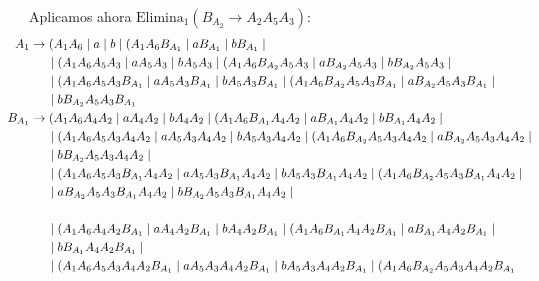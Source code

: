 \documentclass[12pt]{article}
\begin{document}
\begin{ejercicio}[2.5 puntos]
\begin{description}
        Aplicamos ahora $\text{Elimina}_1(B_{A_2}\rightarrow A_2 A_5 A_3)$:
        \begin{align*}
            \hspace{-2.5cm}A_1 &\to (A_1 A_6 \mid a \mid b\mid (A_1 A_6 B_{A_1} \mid a B_{A_1} \mid b B_{A_1}
                \mid \\ & \hspace{0.5cm} \mid (A_1 A_6A_5A_3 \mid aA_5A_3 \mid bA_5A_3 \mid (A_1 A_6 B_{A_2}A_5A_3 \mid  a B_{A_2}A_5A_3 \mid  b B_{A_2}A_5A_3
                \mid \\ & \hspace{0.5cm} \mid (A_1 A_6 A_5 A_3 B_{A_1} \mid aA_5 A_3 B_{A_1} \mid bA_5 A_3 B_{A_1} \mid (A_1 A_6 B_{A_2}A_5 A_3 B_{A_1} \mid  a B_{A_2}A_5 A_3 B_{A_1}
                \mid \\ & \hspace{0.5cm} \mid b B_{A_2}A_5 A_3 B_{A_1} \\
            \hspace{-2.5cm}B_{A_1} &\to (A_1 A_6 A_4 A_2 \mid aA_4 A_2 \mid bA_4 A_2\mid (A_1 A_6 B_{A_1}A_4 A_2 \mid a B_{A_1}A_4 A_2 \mid b B_{A_1}A_4 A_2
                \mid \\ & \hspace{0.5cm} \mid (A_1 A_6A_5A_3A_4 A_2 \mid aA_5A_3 A_4 A_2\mid bA_5A_3A_4 A_2 \mid (A_1 A_6 B_{A_2}A_5A_3 A_4 A_2\mid  a B_{A_2}A_5A_3A_4 A_2
                \mid \\ & \hspace{0.5cm} \mid b B_{A_2}A_5A_3A_4 A_2
                \mid \\ & \hspace{0.5cm} \mid (A_1 A_6 A_5 A_3 B_{A_1}A_4 A_2 \mid aA_5 A_3 B_{A_1}A_4 A_2 \mid bA_5 A_3 B_{A_1}A_4 A_2 \mid (A_1 A_6 B_{A_2}A_5 A_3 B_{A_1}A_4 A_2
                \mid \\ & \hspace{0.5cm} \mid  a B_{A_2}A_5 A_3 B_{A_1}A_4 A_2 \mid b B_{A_2}A_5 A_3 B_{A_1}A_4 A_2
                \mid \\ \hspace{-2.5cm}\\ & \hspace{0.5cm} \mid (A_1 A_6 A_4 A_2 B_{A_1} \mid aA_4 A_2 B_{A_1} \mid bA_4 A_2 B_{A_1}\mid (A_1 A_6 B_{A_1}A_4 A_2 B_{A_1} \mid a B_{A_1}A_4 A_2 B_{A_1}
                \mid \\ & \hspace{0.5cm} \mid b B_{A_1}A_4 A_2 B_{A_1}
                \mid \\ & \hspace{0.5cm} \mid (A_1 A_6A_5A_3A_4 A_2 B_{A_1} \mid aA_5A_3 A_4 A_2 B_{A_1}\mid bA_5A_3A_4 A_2 B_{A_1} \mid (A_1 A_6 B_{A_2}A_5A_3 A_4 A_2 B_{A_1}

\end{align*}
\end{description}
\end{ejercicio}
\end{document}
